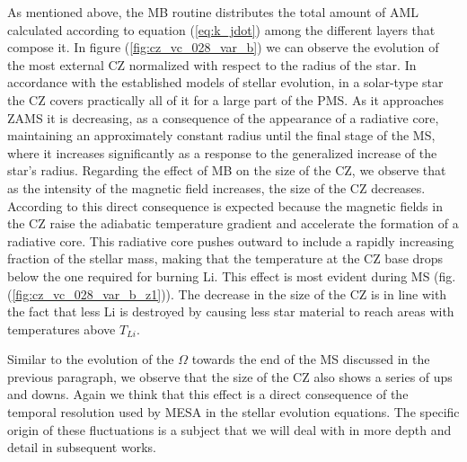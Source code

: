 \documentclass[fleqn,usenatbib]{mnras}
\begin{document}
As mentioned above, the MB routine distributes the total amount of AML calculated according to equation (\ref{eq:k_jdot}) among the different layers that compose it. In figure (\ref{fig:cz_vc_028_var_b}) we can observe the evolution of the most external CZ normalized with respect to the radius of the star. In accordance with the established models of stellar evolution, in a solar-type star the CZ covers practically all of it for a large part of the PMS. As it approaches ZAMS it is decreasing, as a consequence of the appearance of a radiative core, maintaining an approximately constant radius until the final stage of the MS, where it increases significantly as a response to the generalized increase of the star's radius. Regarding the effect of MB on the size of the CZ, we observe that as the intensity of the magnetic field increases, the size of the CZ decreases. According to \citet{Jeffries2004} this direct consequence is expected because the magnetic fields in the CZ raise the adiabatic temperature gradient and accelerate the formation of a radiative core. This radiative core pushes outward to include a rapidly increasing fraction of the stellar mass, making that the temperature at the CZ base drops below the one required for burning Li. This effect is most evident during MS (fig. (\ref{fig:cz_vc_028_var_b_z1})). The decrease in the size of the CZ is in line with the fact that less Li is destroyed by causing less star material to reach areas with temperatures above $T_{Li}$.\par

Similar to the evolution of the $\Omega$ towards the end of the MS discussed in the previous paragraph, we observe that the size of the CZ also shows a series of ups and downs. Again we think that this effect is a direct consequence of the temporal resolution used by MESA in the stellar evolution equations. The specific origin of these fluctuations is a subject that we will deal with in more depth and detail in subsequent works.\par
\end{document}
